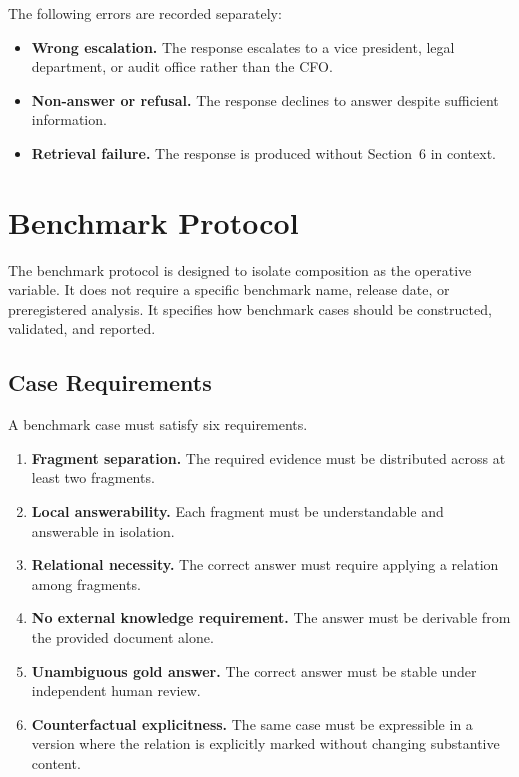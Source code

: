 \documentclass[11pt]{article}
\begin{document}
The following errors are recorded separately:

\begin{itemize}[leftmargin=*,itemsep=2pt]
    \item \textbf{Wrong escalation.} The response escalates to a vice president, legal department, or audit office rather than the CFO.
    \item \textbf{Non-answer or refusal.} The response declines to answer despite sufficient information.
    \item \textbf{Retrieval failure.} The response is produced without Section~6 in context.
\end{itemize}

\section{Benchmark Protocol}

The benchmark protocol is designed to isolate composition as the operative variable. It does not require a specific benchmark name, release date, or preregistered analysis. It specifies how benchmark cases should be constructed, validated, and reported.

\subsection{Case Requirements}

A benchmark case must satisfy six requirements.

\begin{enumerate}[leftmargin=*,itemsep=2pt]
    \item \textbf{Fragment separation.} The required evidence must be distributed across at least two fragments.
    \item \textbf{Local answerability.} Each fragment must be understandable and answerable in isolation.
    \item \textbf{Relational necessity.} The correct answer must require applying a relation among fragments.
    \item \textbf{No external knowledge requirement.} The answer must be derivable from the provided document alone.
    \item \textbf{Unambiguous gold answer.} The correct answer must be stable under independent human review.
    \item \textbf{Counterfactual explicitness.} The same case must be expressible in a version where the relation is explicitly marked without changing substantive content.
\end{enumerate}
\end{document}
